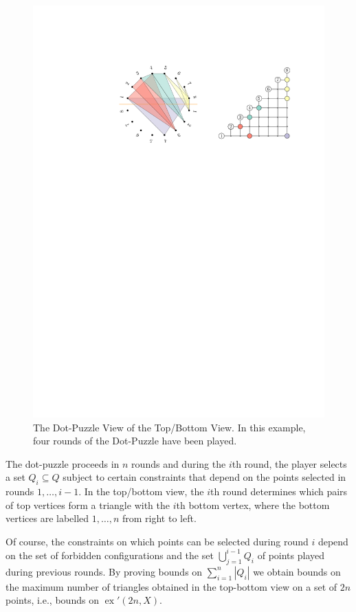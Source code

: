 \documentclass{patmorin}
\DeclareMathOperator{\ex}{ex}
\begin{document}
\begin{figure}
   \begin{center}
      \includegraphics{figs/point-view}
   \end{center}
   \caption{The Dot-Puzzle View of the Top/Bottom View. In this example,
     four rounds of the Dot-Puzzle have been played.}
\end{figure}

The dot-puzzle proceeds in $n$ rounds and during the $i$th round, the
player selects a set $Q_i\subseteq Q$ subject to certain constraints
that depend on the points selected in rounds $1,\ldots,i-1$.  In the
top/bottom view, the $i$th round determines which pairs of top vertices
form a triangle with the $i$th bottom vertex, where the bottom
vertices are labelled $1,\ldots,n$ from right to left.  

Of course, the constraints on which points can be selected during
round $i$ depend on the set of forbidden configurations and the set
$\bigcup_{j=1}^{i-1} Q_i$ of points played during previous rounds.
By proving bounds on $\sum_{i=1}^n |Q_i|$ we obtain bounds on the maximum
number of triangles obtained in the top-bottom view on a set of $2n$
points, i.e., bounds on $\ex'(2n, X)$.
\end{document}
